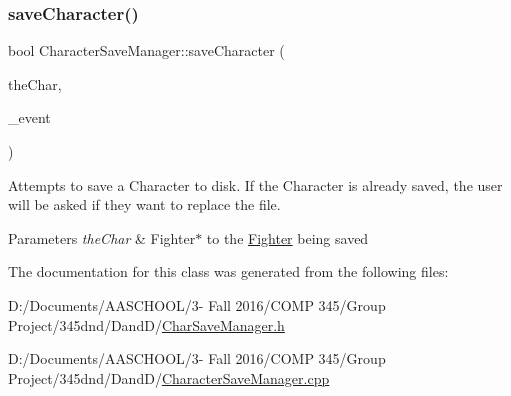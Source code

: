 \subsubsection{\texorpdfstring{save\+Character()}{saveCharacter()}}
{\footnotesize\ttfamily bool Character\+Save\+Manager\+::save\+Character (\begin{DoxyParamCaption}\item[{\hyperlink{class_fighter}{Fighter} $\ast$}]{the\+Char,  }\item[{S\+D\+L\+\_\+\+Event}]{\+\_\+event }\end{DoxyParamCaption})\hspace{0.3cm}{\ttfamily [static]}}

Attempts to save a Character to disk. If the Character is already saved, the user will be asked if they want to replace the file. 
\begin{DoxyParams}{Parameters}
{\em the\+Char} & Fighter$\ast$ to the \hyperlink{class_fighter}{Fighter} being saved \\
\hline
\end{DoxyParams}


The documentation for this class was generated from the following files\+:\begin{DoxyCompactItemize}
\item 
D\+:/\+Documents/\+A\+A\+S\+C\+H\+O\+O\+L/3-\/ Fall 2016/\+C\+O\+M\+P 345/\+Group Project/345dnd/\+Dand\+D/\hyperlink{_char_save_manager_8h}{Char\+Save\+Manager.\+h}\item 
D\+:/\+Documents/\+A\+A\+S\+C\+H\+O\+O\+L/3-\/ Fall 2016/\+C\+O\+M\+P 345/\+Group Project/345dnd/\+Dand\+D/\hyperlink{_character_save_manager_8cpp}{Character\+Save\+Manager.\+cpp}\end{DoxyCompactItemize}
